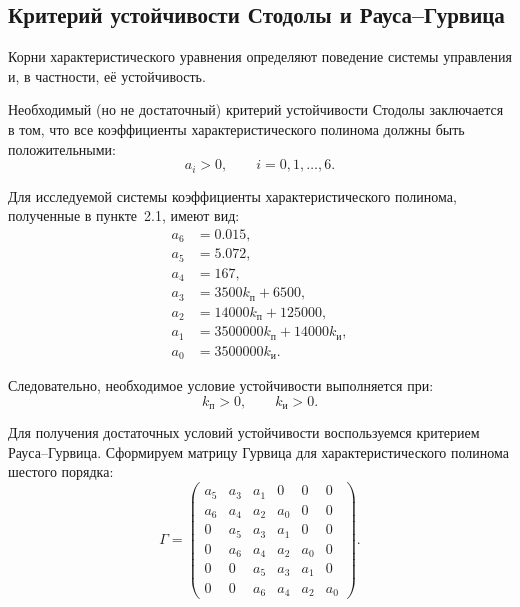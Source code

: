 \subsection{Критерий устойчивости Стодолы и Рауса--Гурвица}

Корни характеристического уравнения определяют поведение системы управления и, в частности, её устойчивость.

Необходимый (но не достаточный) критерий устойчивости Стодолы заключается в том, что все коэффициенты характеристического полинома должны быть положительными:
\begin{equation}
    a_i > 0,
    \qquad i = 0,1,\dots,6.
\end{equation}

Для исследуемой системы коэффициенты характеристического полинома, полученные в пункте~2.1, имеют вид:
\begin{equation}
\begin{aligned}
    a_6 &= 0.015, \\
    a_5 &= 5.072, \\
    a_4 &= 167, \\
    a_3 &= 3500k_{\text{п}} + 6500, \\
    a_2 &= 14000k_{\text{п}} + 125000, \\
    a_1 &= 3500000k_{\text{п}} + 14000k_{\text{и}}, \\
    a_0 &= 3500000k_{\text{и}}.
\end{aligned}
\end{equation}

Следовательно, необходимое условие устойчивости выполняется при:
\begin{equation}
    k_{\text{п}} > 0,
    \qquad
    k_{\text{и}} > 0.
\end{equation}

Для получения достаточных условий устойчивости воспользуемся критерием Рауса--Гурвица. Сформируем матрицу Гурвица для характеристического полинома шестого порядка:
\begin{equation}
\Gamma =
\begin{pmatrix}
a_5 & a_3 & a_1 & 0   & 0   & 0 \\
a_6 & a_4 & a_2 & a_0 & 0   & 0 \\
0   & a_5 & a_3 & a_1 & 0   & 0 \\
0   & a_6 & a_4 & a_2 & a_0 & 0 \\
0   & 0   & a_5 & a_3 & a_1 & 0 \\
0   & 0   & a_6 & a_4 & a_2 & a_0
\end{pmatrix}.
\end{equation}

